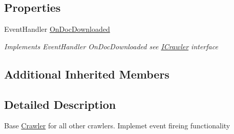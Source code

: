 \subsection*{Properties}
\begin{DoxyCompactItemize}
\item 
Event\-Handler \hyperlink{class_crawler_1_1_classes_1_1_common_1_1_base_crawler_ad619eb3cb32bf3b604975483370ae9c3}{On\-Doc\-Downloaded}
\begin{DoxyCompactList}\small\item\em Implements Event\-Handler On\-Doc\-Downloaded see \hyperlink{interface_crawler_1_1_classes_1_1_common_1_1_i_crawler}{I\-Crawler} interface \end{DoxyCompactList}\end{DoxyCompactItemize}
\subsection*{Additional Inherited Members}


\subsection{Detailed Description}
Base \hyperlink{namespace_crawler}{Crawler} for all other crawlers. Implemet event fireing functionality 



